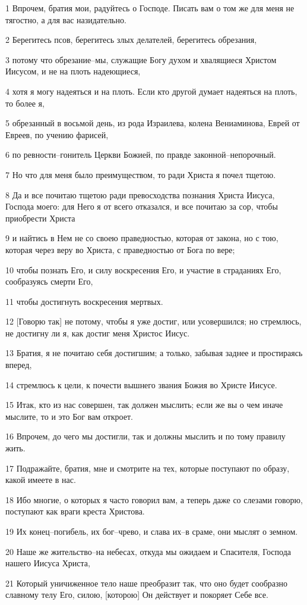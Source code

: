\par 1 Впрочем, братия мои, радуйтесь о Господе. Писать вам о том же для меня не тягостно, а для вас назидательно.
\par 2 Берегитесь псов, берегитесь злых делателей, берегитесь обрезания,
\par 3 потому что обрезание--мы, служащие Богу духом и хвалящиеся Христом Иисусом, и не на плоть надеющиеся,
\par 4 хотя я могу надеяться и на плоть. Если кто другой думает надеяться на плоть, то более я,
\par 5 обрезанный в восьмой день, из рода Израилева, колена Вениаминова, Еврей от Евреев, по учению фарисей,
\par 6 по ревности--гонитель Церкви Божией, по правде законной--непорочный.
\par 7 Но что для меня было преимуществом, то ради Христа я почел тщетою.
\par 8 Да и все почитаю тщетою ради превосходства познания Христа Иисуса, Господа моего: для Него я от всего отказался, и все почитаю за сор, чтобы приобрести Христа
\par 9 и найтись в Нем не со своею праведностью, которая от закона, но с тою, которая через веру во Христа, с праведностью от Бога по вере;
\par 10 чтобы познать Его, и силу воскресения Его, и участие в страданиях Его, сообразуясь смерти Его,
\par 11 чтобы достигнуть воскресения мертвых.
\par 12 [Говорю так] не потому, чтобы я уже достиг, или усовершился; но стремлюсь, не достигну ли я, как достиг меня Христос Иисус.
\par 13 Братия, я не почитаю себя достигшим; а только, забывая заднее и простираясь вперед,
\par 14 стремлюсь к цели, к почести вышнего звания Божия во Христе Иисусе.
\par 15 Итак, кто из нас совершен, так должен мыслить; если же вы о чем иначе мыслите, то и это Бог вам откроет.
\par 16 Впрочем, до чего мы достигли, так и должны мыслить и по тому правилу жить.
\par 17 Подражайте, братия, мне и смотрите на тех, которые поступают по образу, какой имеете в нас.
\par 18 Ибо многие, о которых я часто говорил вам, а теперь даже со слезами говорю, поступают как враги креста Христова.
\par 19 Их конец--погибель, их бог--чрево, и слава их--в сраме, они мыслят о земном.
\par 20 Наше же жительство--на небесах, откуда мы ожидаем и Спасителя, Господа нашего Иисуса Христа,
\par 21 Который уничиженное тело наше преобразит так, что оно будет сообразно славному телу Его, силою, [которою] Он действует и покоряет Себе все.


